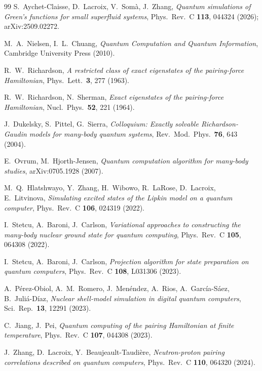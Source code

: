 \documentclass[
  aps,            %
  prc,            %
  reprint,        %
  superscriptaddress,
  floatfix,
  nofootinbib
]{revtex4-2}
\begin{document}
\begin{thebibliography}{99}
S.~Aychet-Claisse, D.~Lacroix, V.~Som\`a, J.~Zhang,
\textit{Quantum simulations of Green's functions for small superfluid systems},
Phys.\ Rev.\ C \textbf{113}, 044324 (2026); arXiv:2509.02272.

M.~A.~Nielsen, I.~L.~Chuang,
\textit{Quantum Computation and Quantum Information},
Cambridge University Press (2010).

R.~W.~Richardson,
\textit{A restricted class of exact eigenstates of the pairing-force Hamiltonian},
Phys.\ Lett.\ \textbf{3}, 277 (1963).

R.~W.~Richardson, N.~Sherman,
\textit{Exact eigenstates of the pairing-force Hamiltonian},
Nucl.\ Phys.\ \textbf{52}, 221 (1964).

J.~Dukelsky, S.~Pittel, G.~Sierra,
\textit{Colloquium: Exactly solvable Richardson-Gaudin models for many-body
quantum systems},
Rev.\ Mod.\ Phys.\ \textbf{76}, 643 (2004).

E.~Ovrum, M.~Hjorth-Jensen,
\textit{Quantum computation algorithm for many-body studies},
arXiv:0705.1928 (2007).

M.~Q.~Hlatshwayo, Y.~Zhang, H.~Wibowo, R.~LaRose, D.~Lacroix, E.~Litvinova,
\textit{Simulating excited states of the Lipkin model on a quantum computer},
Phys.\ Rev.\ C \textbf{106}, 024319 (2022).

I.~Stetcu, A.~Baroni, J.~Carlson,
\textit{Variational approaches to constructing the many-body nuclear ground state
for quantum computing},
Phys.\ Rev.\ C \textbf{105}, 064308 (2022).

I.~Stetcu, A.~Baroni, J.~Carlson,
\textit{Projection algorithm for state preparation on quantum computers},
Phys.\ Rev.\ C \textbf{108}, L031306 (2023).

A.~P\'erez-Obiol, A.~M.~Romero, J.~Men\'endez, A.~Rios, A.~Garc\'ia-S\'aez,
B.~Juli\'a-D\'iaz,
\textit{Nuclear shell-model simulation in digital quantum computers},
Sci.\ Rep.\ \textbf{13}, 12291 (2023).

C.~Jiang, J.~Pei,
\textit{Quantum computing of the pairing Hamiltonian at finite temperature},
Phys.\ Rev.\ C \textbf{107}, 044308 (2023).

J.~Zhang, D.~Lacroix, Y.~Beaujeault-Taudi\`ere,
\textit{Neutron-proton pairing correlations described on quantum computers},
Phys.\ Rev.\ C \textbf{110}, 064320 (2024).


\end{thebibliography}
\end{document}
